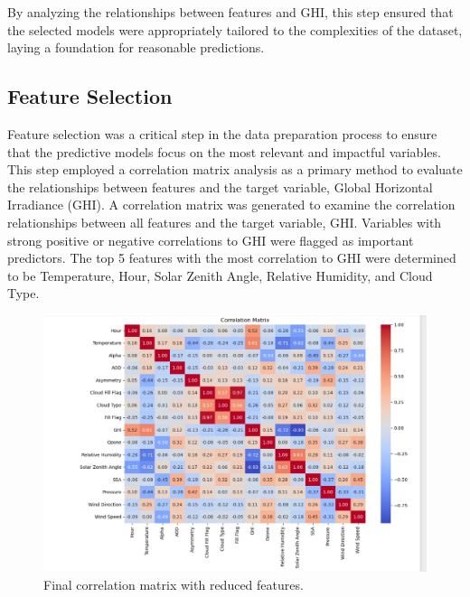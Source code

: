 \documentclass[10pt,twocolumn]{article}
\begin{document}
By analyzing the relationships between features and GHI, this step ensured that the selected models were appropriately tailored to the complexities of the dataset, laying a foundation for reasonable predictions.



 \subsection{Feature Selection}
Feature selection was a critical step in the data preparation process to ensure that the predictive models focus on the most relevant and impactful variables. This step employed a correlation matrix analysis as a primary method to evaluate the relationships between features and the target variable, Global Horizontal Irradiance (GHI).
A correlation matrix was generated to examine the correlation relationships between all features and the target variable, GHI. Variables with strong positive or negative correlations to GHI were flagged as important predictors. The top 5 features with the most correlation to GHI were determined to be Temperature, Hour, Solar Zenith Angle, Relative Humidity, and Cloud Type.
\begin{figure}
            \centering
            \includegraphics[width=1\linewidth]{fincorr.png}
            \caption{Final correlation matrix with reduced features.}
            \label{fig:enter-label}
        \end{figure}
         
    
    \label{Figure 1}
\end{document}
